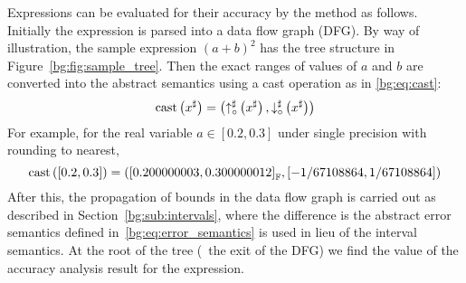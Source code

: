 Expressions can be evaluated for their accuracy by the method as follows.
Initially the expression is parsed into a data flow graph (DFG). By way of
illustration, the sample expression ${(a + b)}^2$ has the tree structure
in Figure~\ref{bg:fig:sample_tree}. Then the exact ranges of values of $a$ and
$b$ are converted into the abstract semantics using a cast operation as in
\eqref{bg:eq:cast}:
\begin{equation}
    \mathrm{cast}\left(x^\sharp\right) = \left(
        \operatorname{\uparrow^\sharp_\circ}\left(x^\sharp\right), \operatorname{\downarrow^\sharp_\circ}\left(x^\sharp\right)
    \right)
    \label{bg:eq:cast}
\end{equation}
For example, for the real variable $a \in [0.2, 0.3]$ under single precision
with rounding to nearest,
\begin{equation}
    \mathrm{cast}\left([0.2, 0.3]\right) = \left(
        {\left[0.200000003, 0.300000012\right]}_\mathbb{F},
        \left[-1/67108864, 1/67108864\right]
    \right)
\end{equation}
After this, the propagation of bounds in the data flow graph is carried out as
described in Section~\ref{bg:sub:intervals}, where the difference is the abstract
error semantics defined in~\eqref{bg:eq:error_semantics} is used in lieu of the
interval semantics. At the root of the tree (\ie~the exit of the DFG) we find
the value of the accuracy analysis result for the expression.
